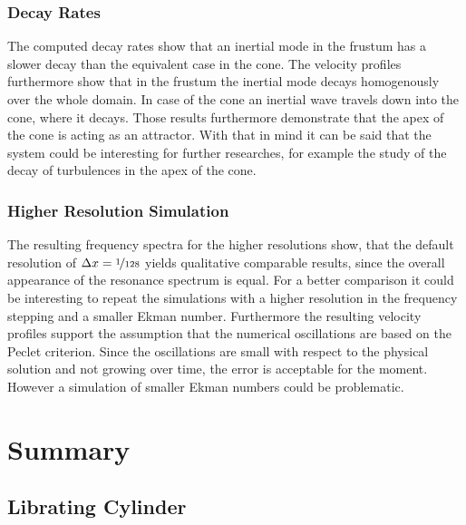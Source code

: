 \subsubsection{Decay Rates}

The computed decay rates show that an inertial mode in the frustum has a slower decay
than the equivalent case in the cone.
The velocity profiles furthermore show that in the frustum the inertial mode decays homogenously over the whole domain.
In case of the cone an inertial wave travels down into the cone, where it decays.
Those results furthermore demonstrate that the apex of the cone is acting as an attractor.
With that in mind it can be said that the system could be interesting for further researches,
for example the study of the decay of turbulences in the apex of the cone.

\subsubsection{Higher Resolution Simulation}

The resulting frequency spectra for the higher resolutions show,
that the default resolution of ${\Delta x = \nicefrac{1}{128}}$ yields
qualitative comparable results, since the overall appearance of the resonance spectrum
is equal.
For a better comparison it could be interesting to repeat the simulations with a
higher resolution in the frequency stepping and a smaller Ekman number.
Furthermore the resulting velocity profiles support the assumption
that the numerical oscillations are based on the Peclet criterion.
Since the oscillations are small with respect to the physical solution and not
growing over time, the error is acceptable for the moment.
However a simulation of smaller Ekman numbers could be problematic.
\clearpage

\section{Summary}

\subsection{Librating Cylinder}


